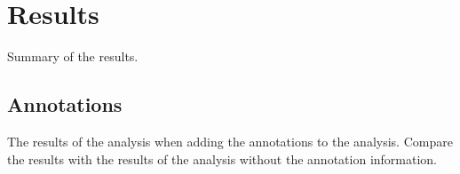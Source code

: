\documentclass[main.tex]{subfiles}
\begin{document}
    \chapter{Results}\label{chap:results}
    Summary of the results.
    \\
    \Blindtext %
    
    \section{Annotations}
    The results of the analysis when adding the annotations to the analysis. Compare the results with the results of the analysis without the annotation information.
    \\
    \Blindtext

    
\end{document}
